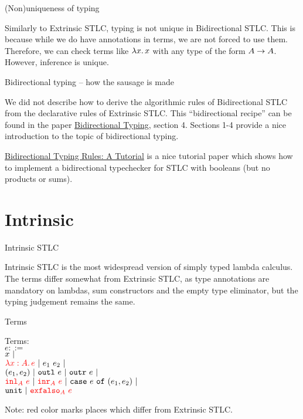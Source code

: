 \documentclass{beamer}
\begin{document}
\begin{frame}{(Non)uniqueness of typing}

Similarly to Extrinsic STLC, typing is not unique in Bidirectional STLC. This is because while we do have annotations in terms, we are not forced to use them. Therefore, we can check terms like $\lambda x.\, x$ with any type of the form $A \to A$. However, inference is unique.

\end{frame}

\begin{frame}{Bidirectional typing -- how the sausage is made}

We did not describe how to derive the algorithmic rules of Bidirectional STLC from the declarative rules of Extrinsic STLC. This ``bidirectional recipe'' can be found in the paper \href{https://arxiv.org/pdf/1908.05839}{Bidirectional Typing}, section 4. Sections 1-4 provide a nice introduction to the topic of bidirectional typing.

\vspace{2em}

\href{http://davidchristiansen.dk/tutorials/bidirectional.pdf}{Bidirectional Typing Rules: A Tutorial} is a nice tutorial paper which shows how to implement a bidirectional typechecker for STLC with booleans (but no products or sums).

\end{frame}

\section{Intrinsic}

\begin{frame}{Intrinsic STLC}

Intrinsic STLC is the most widespread version of simply typed lambda calculus. The terms differ somewhat from Extrinsic STLC, as type annotations are mandatory on lambdas, sum constructors and the empty type eliminator, but the typing judgement remains the same.

\end{frame}

\begin{frame}{Terms}

Terms: \\
$e ::=$ \\
\qquad $x \ |\ $ \\
\qquad $\termdiff{\ifun{x}{A}{e}} \pipe \app{e_1}{e_2} \pipe$ \\
\qquad $(e_1, e_2) \ |\  \texttt{outl}\ e \ |\  \texttt{outr}\ e \ |\ $ \\
\qquad $\termdiff{\iinl{A}{e}} \pipe \termdiff{\iinr{A}{e}} \pipe \case{e}{e_1}{e_2} \pipe$ \\
\qquad $\unit \pipe \termdiff{\iexfalso{A}{e}}$

\vspace{2em}

Note: red color marks places which differ from Extrinsic STLC.

\end{frame}
\end{document}

